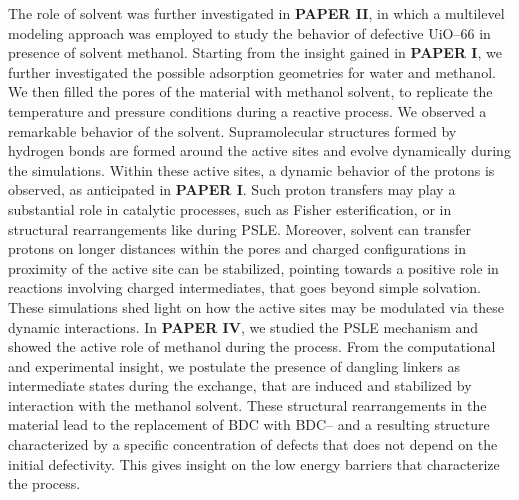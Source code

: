 \npar
The role of solvent was further investigated in \textbf{PAPER II}, in which a multilevel modeling approach was employed to study the behavior of defective UiO--66 in presence of solvent methanol. Starting from the insight gained in \textbf{PAPER I}, we further investigated the possible adsorption geometries for water and methanol. We then filled the pores of the material with methanol solvent, to replicate the temperature and pressure conditions during a reactive process. We observed a remarkable behavior of the solvent. Supramolecular structures formed by hydrogen bonds are formed around the active sites and evolve dynamically during the simulations. Within these active sites, a dynamic behavior of the protons is observed, as anticipated in \textbf{PAPER I}. Such proton transfers may play a substantial role in catalytic processes, such as Fisher esterification, or in structural rearrangements like during PSLE. Moreover, solvent can transfer protons on longer distances within the pores and charged configurations in proximity of the active site can be stabilized, pointing towards a positive role in reactions involving charged intermediates, that goes beyond simple solvation. These simulations shed light on how the active sites may be modulated via these dynamic interactions. 
\npar
In \textbf{PAPER IV}, we studied the PSLE mechanism and showed the active role of methanol during the process. From the computational and experimental insight, we postulate the presence of dangling linkers as intermediate states during the exchange, that are induced and stabilized by interaction with the methanol solvent. These structural rearrangements in the material lead to the replacement of BDC with BDC-- and a resulting structure characterized by a specific concentration of defects that does not depend on the initial defectivity. This gives insight on the low energy barriers that characterize the process.
\npar
